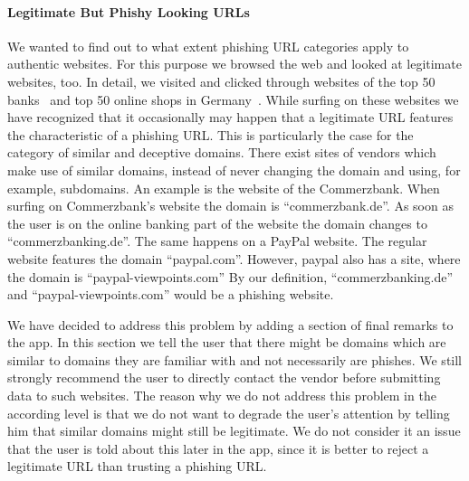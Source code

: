 \paragraph{Legitimate But Phishy Looking URLs}
We wanted to find out to what extent phishing URL categories apply to authentic websites.
For this purpose we browsed the web and looked at legitimate websites, too. 
In detail, we visited and clicked through websites of the top 50 banks~\cite{bankrank} and top 50 online shops in Germany~\cite{onlineshoprank}. 
While surfing on these websites we have recognized that it occasionally may happen that a legitimate URL features the characteristic of a phishing URL. 
This is particularly the case for the category of similar and deceptive domains. 
There exist sites of vendors which make use of similar domains, instead of never changing the domain and using, for example, subdomains. 
An example is the website of the Commerzbank. 
When surfing on Commerzbank's website the domain is ``commerzbank.de''. 
As soon as the user is on the online banking part of the website the domain changes to ``commerzbanking.de''. 
The same happens on a PayPal website. 
The regular website features the domain ``paypal.com''.
However, paypal also has a site, where the domain is ``paypal-viewpoints.com''
By our definition, ``commerzbanking.de'' and  ``paypal-viewpoints.com'' would be a phishing website. 

We have decided to address this problem by adding a section of final remarks to the app. 
In this section we tell the user that there might be domains which are similar to domains they are familiar with and not necessarily are phishes. 
We still strongly recommend the user to directly contact the vendor before submitting data to such websites. 
The reason why we do not address this problem in the according level is that we do not want to degrade the user's attention by telling him that similar domains might still be legitimate. 
We do not consider it an issue that the user is told about this later in the app, since it is better to reject a legitimate URL than trusting a phishing URL. 

